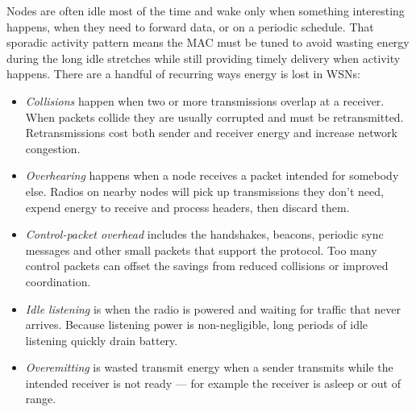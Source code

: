 Nodes are often idle most of the time and wake only when something interesting happens, when they need to forward data, or on a periodic schedule. That sporadic activity pattern means the MAC must be tuned to avoid wasting energy during the long idle stretches while still providing timely delivery when activity happens.
There are a handful of recurring ways energy is lost in WSNs:
\begin{itemize}
    \item \textit{Collisions} happen when two or more transmissions overlap at a receiver. When packets collide they are usually corrupted and must be retransmitted. Retransmissions cost both sender and receiver energy and increase network congestion.
    \item \textit{Overhearing} happens when a node receives a packet intended for somebody else. Radios on nearby nodes will pick up transmissions they don’t need, expend energy to receive and process headers, then discard them.
    \item \textit{Control-packet overhead} includes the handshakes, beacons, periodic sync messages and other small packets that support the protocol. Too many control packets can offset the savings from reduced collisions or improved coordination.
    \item \textit{Idle listening} is when the radio is powered and waiting for traffic that never arrives. Because listening power is non-negligible, long periods of idle listening quickly drain battery.
    \item \textit{Overemitting} is wasted transmit energy when a sender transmits while the intended receiver is not ready — for example the receiver is asleep or out of range.
\end{itemize}

